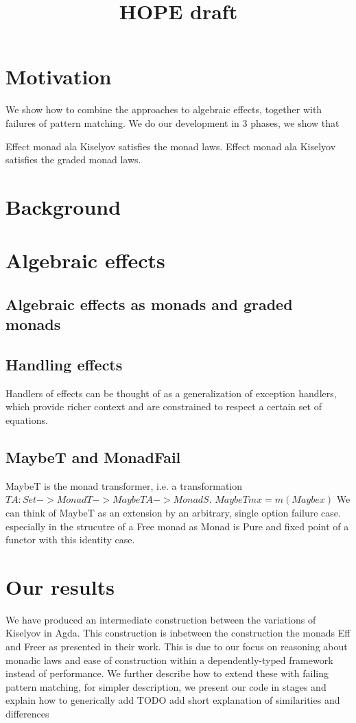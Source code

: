 \documentclass{article}
\begin{document}
\title{HOPE draft}


\section{Motivation}
We show how to combine the approaches to algebraic effects, together with failures of pattern matching.
We do our development in 3 phases, we show that 

Effect monad ala Kiselyov satisfies the monad laws.
Effect monad ala Kiselyov satisfies the graded monad laws.

\section{Background}

\section{Algebraic effects}



\subsection{Algebraic effects as monads and graded monads}

\subsection{Handling effects}

Handlers of effects can be thought of as a generalization of exception handlers, which provide richer context
and are constrained to respect a certain set of equations.
\subsection{MaybeT and MonadFail}

MaybeT is the monad transformer, i.e. a transformation ${T A : Set} -> Monad T -> Maybe T A -> Monad S$.
$MaybeT m x = m (Maybe x)$
We can think of MaybeT as an extension by an arbitrary, single option failure case. especially in the strucutre of
a Free monad as Monad is Pure and fixed point of a functor with this identity case.


\section{Our results}

We have produced an intermediate construction between the variations of Kiselyov in Agda.
This construction is inbetween the construction the monads Eff and Freer as presented in their work. This is due to our focus on reasoning about monadic laws and
ease of construction within a dependently-typed framework instead of performance.
We further describe how to extend these with failing pattern matching, for simpler description, we present our code in stages and explain how to generically add 
TODO add short explanation of similarities and differences
\end{document}
